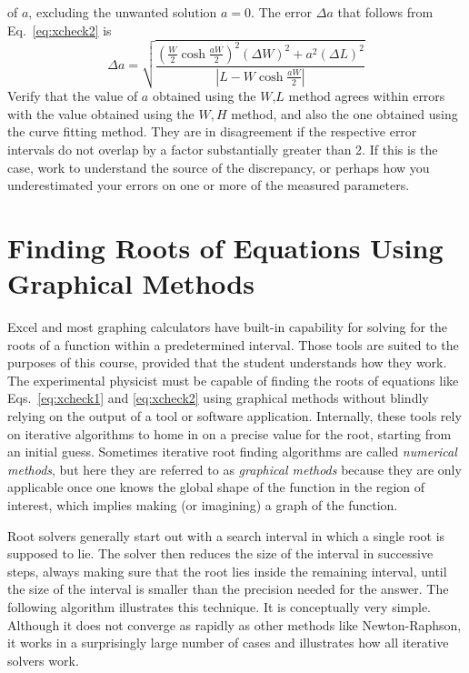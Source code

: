 \documentclass{revtex4}
\begin{document}
of $a$, excluding the unwanted solution $a=0$. The error $\Delta a$
that follows from Eq.~\ref{eq:xcheck2} is
\begin{equation}
\Delta a = \sqrt{\frac{\left(\frac{W}{2}\cosh{\frac{aW}{2}}\right)^2
(\Delta W)^2 +a^2(\Delta L)^2}{\left| L-W\cosh{\frac{aW}{2}}\right|}}
\label{eq:xcheck2err}
\end{equation}
Verify that the value of $a$ obtained using the $W$,$L$ method agrees
within errors with the value obtained using the $W,H$ method, and also
the one obtained using the curve fitting method. They are in disagreement
if the respective error intervals do not overlap by a factor substantially
greater than 2. If this is the case, work to understand the source of the
discrepancy, or perhaps how you underestimated your errors on one or 
more of the measured parameters.

\section{Finding Roots of Equations Using Graphical Methods}

Excel and most graphing calculators have built-in capability for solving
for the roots of a function within a predetermined interval. Those tools
are suited to the purposes of this course, provided that the student
understands how they work. The experimental physicist must be capable of
finding the roots of equations like Eqs.~\ref{eq:xcheck1} and \ref{eq:xcheck2}
using graphical methods without blindly relying on the output of a tool or
software application.  Internally, these tools rely on iterative algorithms
to home in on a precise value for the root, starting from an initial guess.
Sometimes iterative root finding algorithms are called {\em numerical methods},
but here they are referred to as {\em graphical methods} because they are
only applicable once one knows the global shape of the function in the region
of interest, which implies making (or imagining) a graph of the function.

Root solvers generally start out with a search interval in which a single
root is supposed to lie. The solver then reduces the size of the interval
in successive steps, always making sure that the root lies inside the
remaining interval, until the size of the interval is smaller than the
precision needed for the answer. The following algorithm illustrates this
technique.  It is conceptually very simple. Although it does not converge
as rapidly as other methods like Newton-Raphson, it works in a surprisingly
large number of cases and illustrates how all iterative solvers work.
\end{document}
